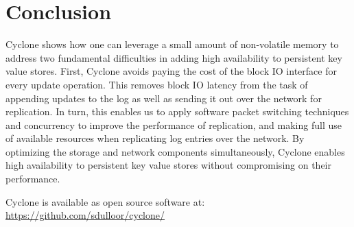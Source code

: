 \documentclass[twocolumn]{article}
\begin{document}
\section{Conclusion}
Cyclone shows how one can leverage a small amount of non-volatile memory to
address two fundamental difficulties in adding high availability to persistent
key value stores. First, Cyclone avoids
paying the cost of the block IO interface for every update operation. This
removes block IO latency from the task of appending updates to the log as well
as sending it out over the network for replication. In turn, this enables us to
apply software packet switching techniques and concurrency to improve the
performance of replication, and making full use of available resources when
replicating log entries over the network. By optimizing the storage and network
components simultaneously, Cyclone enables high availability to persistent key
value stores without compromising on their performance.

Cyclone is available as open source software at:\\
\url{https://github.com/sdulloor/cyclone/}
\newcommand\myurl[2]{\url{#1}}


\end{document}
